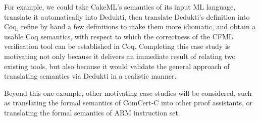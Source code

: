 \begin{workpackage}[id=libraries,wphases=0-48,type=RTD,
  short=Libraries,%
  title=Libraries,
  lead=Inr,
  InrRM=10,
  TumRM=24]
For example, we could take CakeML's semantics of its input ML language,
translate it automatically into Dedukti, then translate Dedukti's
definition into Coq, refine by hand a few definitions to make them more
idiomatic, and obtain a usable Coq semantics, with respect to which
the correctness of the CFML verification tool can be established in Coq.
Completing this case study is motivating not only because it delivers
an immediate result of relating two existing tools, but also because it
would validate the general approach of translating semantics via Dedukti
in a realistic manner.

Beyond this one example, other motivating case studies will be considered,
such as translating the formal semantics of ComCert-C into other proof
assistants, or translating the formal semantics of ARM instruction set.


\begin{tasklist}
\begin{task}[id=mathcomp,title=MathComp]
\end{task}

\begin{task}[id=milc,title=Revised Coq Analysis Library]
\end{task}


\begin{task}[id=afp,title=The Isabelle Archive of Formal Proofs]
\end{task}

\begin{task}[id=isaAnalysisProb,title=The Isabelle Analysis \& Probability library]


\end{task}
\end{tasklist}
\end{workpackage}

